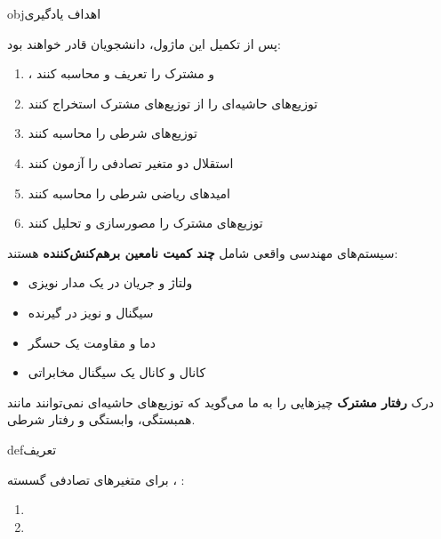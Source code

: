 \begin{PSbox}[unbreakable]{obj}{اهداف یادگیری}

پس از تکمیل این ماژول، دانشجویان قادر خواهند بود:

\begin{enumerate}
\def\labelenumi{\arabic{enumi}.}
\tightlist
\item
  ،  و  مشترک را تعریف و محاسبه کنند
\item
  توزیع‌های حاشیه‌ای را از توزیع‌های مشترک استخراج کنند
\item
  توزیع‌های شرطی را محاسبه کنند
\item
  استقلال دو متغیر تصادفی را آزمون کنند
\item
  امیدهای ریاضی شرطی را محاسبه کنند
\item
  توزیع‌های مشترک را مصورسازی و تحلیل کنند
\end{enumerate}

\end{PSbox}


سیستم‌های مهندسی واقعی شامل \textbf{چند کمیت نامعین برهم‌کنش‌کننده} هستند:

\begin{itemize}
\tightlist
\item
  ولتاژ و جریان در یک مدار نویزی
\item
  سیگنال و نویز در گیرنده
\item
  دما و مقاومت یک حسگر
\item
  کانال  و کانال  یک سیگنال مخابراتی
\end{itemize}

درک \textbf{رفتار مشترک} چیزهایی را به ما می‌گوید که توزیع‌های حاشیه‌ای نمی‌توانند  مانند همبستگی، وابستگی و رفتار شرطی.


\begin{PSbox}[unbreakable]{def}{تعریف}

برای متغیرهای تصادفی گسسته ، :

\end{PSbox}


\begin{enumerate}
\def\labelenumi{\arabic{enumi}.}
\tightlist
\item
\item
\end{enumerate}


